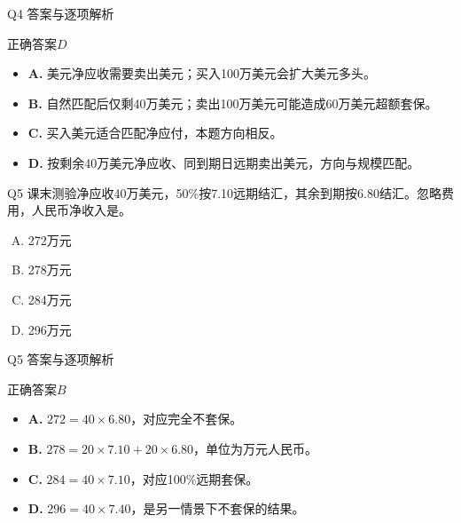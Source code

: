 \documentclass[aspectratio=169,compress,11pt]{beamer}
\newcommand{\currentweeklabel}{导入}
\begin{document}
\renewcommand{\currentweeklabel}{对冲}\begin{frame}[t]{Q4 答案与逐项解析}\relax\hypertarget{slide10}{}\fontsize{10.5}{12.8}\selectfont\setlength{\abovedisplayskip}{.25em}\setlength{\belowdisplayskip}{.25em}\begin{exampleblock}{正确答案}\(D\)\end{exampleblock}\begin{itemize}\setlength{\itemsep}{.4em}\item \textbf{A. }美元净应收需要卖出美元；买入100万美元会扩大美元多头。\item \textbf{B. }自然匹配后仅剩40万美元；卖出100万美元可能造成60万美元超额套保。\item \textbf{C. }买入美元适合匹配净应付，本题方向相反。\item \textbf{D. }按剩余40万美元净应收、同到期日远期卖出美元，方向与规模匹配。\end{itemize}\end{frame}
\renewcommand{\currentweeklabel}{决策}\begin{frame}[t]{Q5 课末测验}\relax\hypertarget{slide11}{}\fontsize{10.5}{12.8}\selectfont\setlength{\abovedisplayskip}{.25em}\setlength{\belowdisplayskip}{.25em}净应收40万美元，50\%按7.10远期结汇，其余到期按6.80结汇。忽略费用，人民币净收入是。\par\vspace{.7em}\begin{enumerate}[A.]\setlength{\itemsep}{.7em}\item 272万元\item 278万元\item 284万元\item 296万元\end{enumerate}\end{frame}
\renewcommand{\currentweeklabel}{决策}\begin{frame}[t]{Q5 答案与逐项解析}\relax\hypertarget{slide12}{}\fontsize{10.5}{12.8}\selectfont\setlength{\abovedisplayskip}{.25em}\setlength{\belowdisplayskip}{.25em}\begin{exampleblock}{正确答案}\(B\)\end{exampleblock}\begin{itemize}\setlength{\itemsep}{.4em}\item \textbf{A. }\(272=40\times 6.80\)，对应完全不套保。\item \textbf{B. }\(278=20\times 7.10+20\times 6.80\)，单位为万元人民币。\item \textbf{C. }\(284=40\times 7.10\)，对应100\%远期套保。\item \textbf{D. }\(296=40\times 7.40\)，是另一情景下不套保的结果。\end{itemize}\end{frame}
\end{document}

